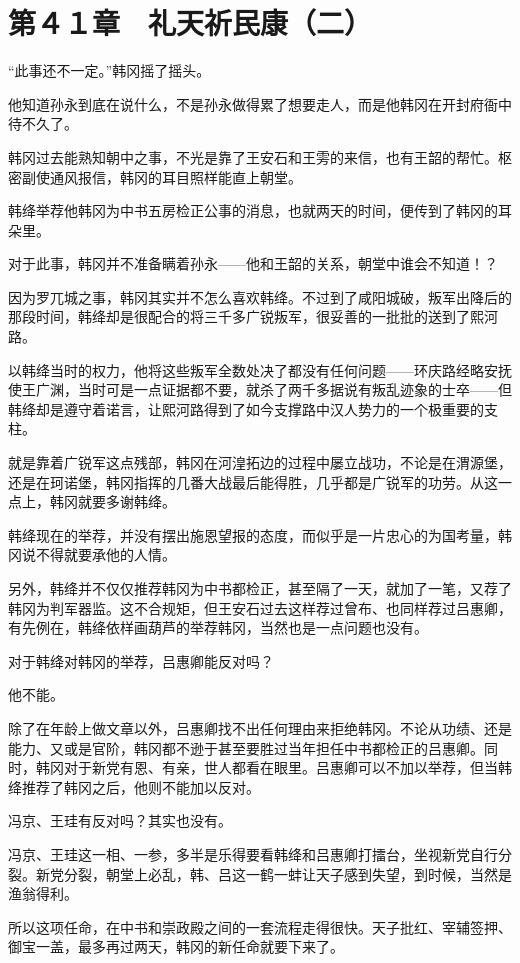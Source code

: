 \section{第４１章　礼天祈民康（二）}

“此事还不一定。”韩冈摇了摇头。

他知道孙永到底在说什么，不是孙永做得累了想要走人，而是他韩冈在开封府衙中待不久了。

韩冈过去能熟知朝中之事，不光是靠了王安石和王雱的来信，也有王韶的帮忙。枢密副使通风报信，韩冈的耳目照样能直上朝堂。

韩绛举荐他韩冈为中书五房检正公事的消息，也就两天的时间，便传到了韩冈的耳朵里。

对于此事，韩冈并不准备瞒着孙永——他和王韶的关系，朝堂中谁会不知道！？

因为罗兀城之事，韩冈其实并不怎么喜欢韩绛。不过到了咸阳城破，叛军出降后的那段时间，韩绛却是很配合的将三千多广锐叛军，很妥善的一批批的送到了熙河路。

以韩绛当时的权力，他将这些叛军全数处决了都没有任何问题——环庆路经略安抚使王广渊，当时可是一点证据都不要，就杀了两千多据说有叛乱迹象的士卒——但韩绛却是遵守着诺言，让熙河路得到了如今支撑路中汉人势力的一个极重要的支柱。

就是靠着广锐军这点残部，韩冈在河湟拓边的过程中屡立战功，不论是在渭源堡，还是在珂诺堡，韩冈指挥的几番大战最后能得胜，几乎都是广锐军的功劳。从这一点上，韩冈就要多谢韩绛。

韩绛现在的举荐，并没有摆出施恩望报的态度，而似乎是一片忠心的为国考量，韩冈说不得就要承他的人情。

另外，韩绛并不仅仅推荐韩冈为中书都检正，甚至隔了一天，就加了一笔，又荐了韩冈为判军器监。这不合规矩，但王安石过去这样荐过曾布、也同样荐过吕惠卿，有先例在，韩绛依样画葫芦的举荐韩冈，当然也是一点问题也没有。

对于韩绛对韩冈的举荐，吕惠卿能反对吗？

他不能。

除了在年龄上做文章以外，吕惠卿找不出任何理由来拒绝韩冈。不论从功绩、还是能力、又或是官阶，韩冈都不逊于甚至要胜过当年担任中书都检正的吕惠卿。同时，韩冈对于新党有恩、有亲，世人都看在眼里。吕惠卿可以不加以举荐，但当韩绛推荐了韩冈之后，他则不能加以反对。

冯京、王珪有反对吗？其实也没有。

冯京、王珪这一相、一参，多半是乐得要看韩绛和吕惠卿打擂台，坐视新党自行分裂。新党分裂，朝堂上必乱，韩、吕这一鹤一蚌让天子感到失望，到时候，当然是渔翁得利。

所以这项任命，在中书和崇政殿之间的一套流程走得很快。天子批红、宰辅签押、御宝一盖，最多再过两天，韩冈的新任命就要下来了。

